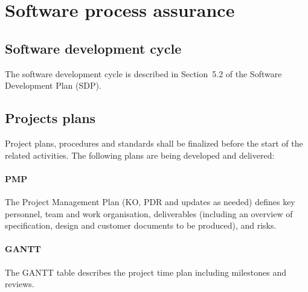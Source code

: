\section{Software process assurance}

\subsection{Software development cycle}

%
%

The software development cycle is described in Section~5.2 of the Software Development Plan (SDP).

\subsection{Projects plans}
\label{subsec:project-plans}


%

Project plans, procedures and standards shall be finalized before the start of the related activities. The following plans are being developed and delivered:

\paragraph*{PMP} The Project Management Plan (KO, PDR and updates as needed) defines key personnel, team and work organisation, deliverables (including an overview of specification, design and customer documents to be produced), and risks.
    
\paragraph*{GANTT} The GANTT table describes the project time plan including milestones and reviews.
    
